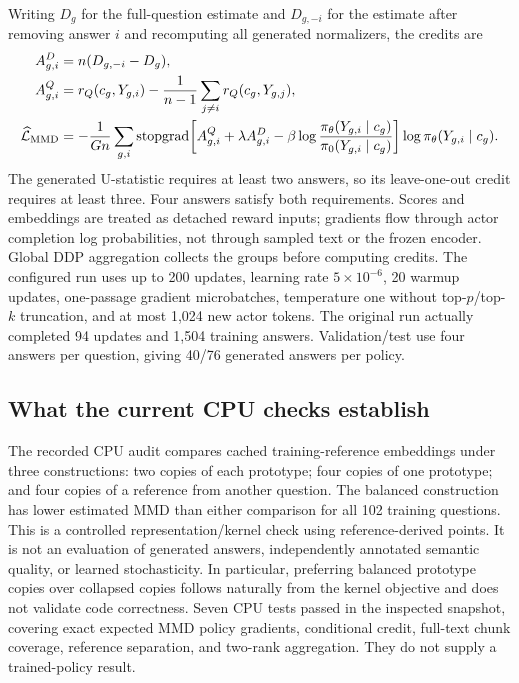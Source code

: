 Writing $D_g$ for the full-question estimate and $D_{g,-i}$ for the
estimate after removing answer $i$ and recomputing all generated
normalizers, the credits are
\begin{align}
 A^D_{g,i}&=n(D_{g,-i}-D_g),\\
 A^Q_{g,i}&=r_Q(c_g,Y_{g,i})-
               \frac1{n-1}\sum_{j\ne i}r_Q(c_g,Y_{g,j}),\\
 \widehat{\mathcal L}_{\mathrm{MMD}}
 &=-\frac1{Gn}\sum_{g,i}\operatorname{stopgrad}\!\left[A^Q_{g,i}+\lambda A^D_{g,i}
       -\beta\log\frac{\pi_\theta(Y_{g,i}\mid c_g)}{\pi_0(Y_{g,i}\mid c_g)}\right]
       \log\pi_\theta(Y_{g,i}\mid c_g).
 \label{eq:mmdsurrogate}
\end{align}
The generated U-statistic requires at least two answers, so its
leave-one-out credit requires at least three. Four answers satisfy both
requirements. Scores and embeddings are treated as detached reward
inputs; gradients flow through actor completion log probabilities,
not through sampled text or the frozen encoder. Global DDP aggregation
collects the groups before computing credits. The configured run uses
up to 200 updates, learning rate $5\times10^{-6}$, 20 warmup updates,
one-passage gradient microbatches, temperature one without top-$p$/top-$k$
truncation, and at most 1,024 new actor tokens. The original run actually
completed 94 updates and 1,504 training answers. Validation/test use
four answers per question, giving 40/76 generated answers per policy.

\subsection{What the current CPU checks establish}
The recorded CPU audit compares cached training-reference embeddings
under three constructions: two copies of each prototype; four copies
of one prototype; and four copies of a reference from another question.
The balanced construction has lower estimated MMD than either
comparison for all 102 training questions. This is a controlled
representation/kernel check using reference-derived points. It is not
an evaluation of generated answers, independently annotated semantic
quality, or learned stochasticity. In particular, preferring balanced
prototype copies over collapsed copies follows naturally from the
kernel objective and does not validate code correctness.
Seven CPU tests passed in the inspected snapshot, covering exact expected
MMD policy gradients, conditional credit, full-text chunk coverage,
reference separation, and two-rank aggregation. They do not supply a
trained-policy result.

